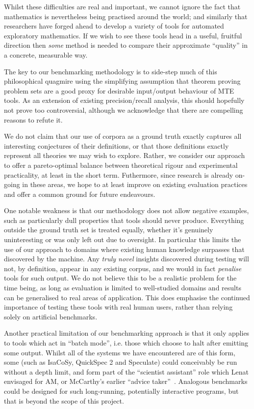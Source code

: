 Whilst these difficulties are real and important, we cannot ignore the fact that
mathematics is nevertheless being practised around the world; and similarly that
researchers have forged ahead to develop a variety of tools for automated
exploratory mathematics. If we wish to see these tools head in a useful,
fruitful direction then \emph{some} method is needed to compare their
approximate ``quality'' in a concrete, measurable way.

The key to our benchmarking methodology is to side-step much of this
philosophical quagmire using the simplifying assumption that theorem proving
problem sets are a good proxy for desirable input/output behaviour of MTE tools.
As an extension of existing precision/recall analysis, this should hopefully not
prove too controversial, although we acknowledge that there are compelling
reasons to refute it.

We do not claim that our use of corpora as a ground truth exactly captures all
interesting conjectures of their definitions, or that those definitions exactly
represent all theories we may wish to explore. Rather, we consider our approach
to offer a pareto-optimal balance between theoretical rigour and experimental
practicality, at least in the short term. Futhermore, since research is already
on-going in these areas, we hope to at least improve on existing evaluation
practices and offer a common ground for future endeavours.

One notable weakness is that our methodology does not allow negative examples,
such as particularly dull properties that tools should never produce. Everything
outside the ground truth set is treated equally, whether it's genuinely
uninteresting or was only left out due to oversight. In particular this limits
the use of our approach to domains where existing human knowledge surpasses that
discovered by the machine. Any \emph{truly novel} insights discovered during
testing will not, by definition, appear in any existing corpus, and we would in
fact \emph{penalise} tools for such output. We do not believe this to be a
realistic problem for the time being, as long as evaluation is limited to
well-studied domains and results can be generalised to real areas of
application. This does emphasise the continued importance of testing these tools
with real human users, rather than relying solely on artificial benchmarks.

Another practical limitation of our benchmarking approach is that it only
applies to tools which act in ``batch mode'', i.e. those which choose to halt
after emitting some output. Whilst all of the systems we have encountered are of
this form, some (such as IsaCoSy, QuickSpec 2 and Speculate) could conceivably
be run without a depth limit, and form part of the ``scientist assistant'' role
which Lenat envisaged for AM, or McCarthy's earlier ``advice
taker''~\cite{McCarthy_Programs59}. Analogous benchmarks could be designed for
such long-running, potentially interactive programs, but that is beyond the
scope of this project.

